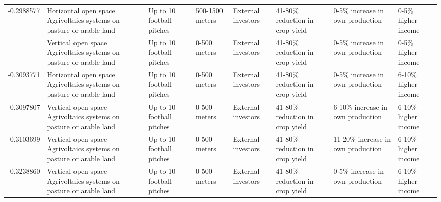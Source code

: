 \begin{table}
\begin{tabular}[t]{rlllllll}
-0.2988577 & Horizontal open space Agrivoltaics
systems on pasture or arable land & Up to 10 football pitches & 500-1500 meters & External investors & 41-80\% reduction in crop yield & 0-5\% increase in own production & 0-5\% higher income\\
\addlinespace
-0.3040576 & Vertical open space Agrivoltaics
systems on pasture or arable land & Up to 10 football pitches & 0-500 meters & External investors & 41-80\% reduction in crop yield & 0-5\% increase in own production & 0-5\% higher income\\
-0.3093771 & Horizontal open space Agrivoltaics
systems on pasture or arable land & Up to 10 football pitches & 0-500 meters & External investors & 41-80\% reduction in crop yield & 0-5\% increase in own production & 6-10\% higher income\\
-0.3097807 & Vertical open space Agrivoltaics
systems on pasture or arable land & Up to 10 football pitches & 0-500 meters & External investors & 41-80\% reduction in crop yield & 6-10\% increase in own production & 6-10\% higher income\\
-0.3103699 & Vertical open space Agrivoltaics
systems on pasture or arable land & Up to 10 football pitches & 0-500 meters & External investors & 41-80\% reduction in crop yield & 11-20\% increase in own production & 6-10\% higher income\\
-0.3238860 & Vertical open space Agrivoltaics
systems on pasture or arable land & Up to 10 football pitches & 0-500 meters & External investors & 41-80\% reduction in crop yield & 0-5\% increase in own production & 6-10\% higher income\\
\bottomrule
\end{tabular}
\end{table}
